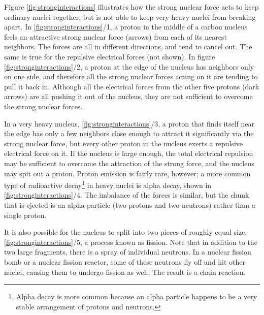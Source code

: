         Figure \ref{fig:stronginteractions} illustrates how the strong nuclear force acts to
        keep ordinary nuclei together, but is not able to keep very
        heavy nuclei from breaking apart. In \ref{fig:stronginteractions}/1,
        a proton in the
        middle of a carbon nucleus feels an attractive strong
        nuclear force (arrows) from each of its nearest neighbors.
        The forces are all in different directions, and tend to
        cancel out. The same is true for the repulsive electrical
        forces (not shown). In figure
        \ref{fig:stronginteractions}/2, a proton at the edge of the nucleus
        has neighbors only on one side, and therefore all the strong
        nuclear forces acting on it are tending to pull it back in.
        Although all the electrical forces from the other five
        protons (dark arrows) are all pushing it out of the nucleus,
        they are not sufficient to overcome the strong nuclear forces.

        In a very heavy nucleus, \ref{fig:stronginteractions}/3, a proton that finds itself
        near the edge has only a few neighbors close enough to
        attract it significantly via the strong nuclear force, but
        every other proton in the nucleus exerts a repulsive
        electrical force on it. If the nucleus is large enough, the
        total electrical repulsion may be sufficient to overcome the
        attraction of the strong force, and the nucleus may spit out
        a proton. Proton emission is fairly rare, however; a more
        common type of radioactive decay\footnote{Alpha decay is more common
        because an alpha particle happens to be a very stable
        arrangement of protons and neutrons.}
        in heavy nuclei is alpha
        decay, shown in \ref{fig:stronginteractions}/4.
        The imbalance of the forces is similar,
        but the chunk that is ejected is an alpha particle (two
        protons and two neutrons) rather than a single proton.

        It is also possible for the nucleus to split into two pieces
        of roughly equal size, \ref{fig:stronginteractions}/5, a process known as fission.  
        Note that in addition to the two large fragments, there is a spray of
        individual neutrons. In a nuclear fission bomb or a nuclear fission reactor,
        some of these neutrons fly off and hit other nuclei, causing them to undergo
        fission as well. The result is a chain reaction.

